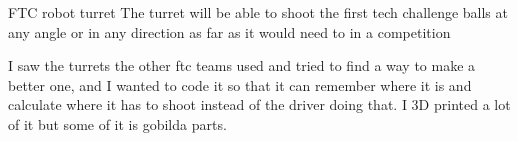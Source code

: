 FTC robot turret
The turret will be able to shoot the first tech challenge balls at any angle or in any direction as far as it would need to in a competition

I saw the turrets the other ftc teams used and tried to find a way to make a better one, and I wanted to code it so that it can remember where it is and calculate where it has to shoot instead of the driver doing that. I 3D printed a lot of it but some of it is gobilda parts.

